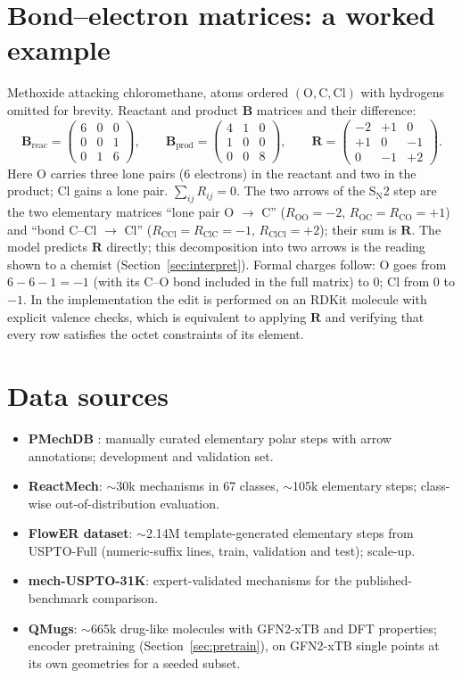 \documentclass[11pt,a4paper]{article}
\newcommand{\vb}[1]{\bm{#1}}
\begin{document}
\section{Bond--electron matrices: a worked example}
\label{app:be}
Methoxide attacking chloromethane, atoms ordered $(\mathrm{O},\mathrm{C},\mathrm{Cl})$ with hydrogens omitted for brevity. Reactant and product $\vb{B}$ matrices and their difference:
\[
\vb{B}_{\mathrm{reac}}=\begin{pmatrix}6&0&0\\0&0&1\\0&1&6\end{pmatrix},\qquad
\vb{B}_{\mathrm{prod}}=\begin{pmatrix}4&1&0\\1&0&0\\0&0&8\end{pmatrix},\qquad
\vb{R}=\begin{pmatrix}-2&+1&0\\+1&0&-1\\0&-1&+2\end{pmatrix}.
\]
Here O carries three lone pairs (6 electrons) in the reactant and two in the product; Cl gains a lone pair. $\sum_{ij}R_{ij}=0$. The two arrows of the S$_\mathrm{N}$2 step are the two elementary matrices ``lone pair O $\to$ C'' ($R_{\mathrm{OO}}=-2$, $R_{\mathrm{OC}}=R_{\mathrm{CO}}=+1$) and ``bond C--Cl $\to$ Cl'' ($R_{\mathrm{CCl}}=R_{\mathrm{ClC}}=-1$, $R_{\mathrm{ClCl}}=+2$); their sum is $\vb{R}$. The model predicts $\vb{R}$ directly; this decomposition into two arrows is the reading shown to a chemist (Section~\ref{sec:interpret}). Formal charges follow: O goes from $6-6-1=-1$ (with its C--O bond included in the full matrix) to $0$; Cl from $0$ to $-1$. In the implementation the edit is performed on an RDKit molecule with explicit valence checks, which is equivalent to applying $\vb{R}$ and verifying that every row satisfies the octet constraints of its element.

\section{Data sources}
\label{app:data}
\begin{itemize}[nosep]
\item \textbf{PMechDB} \cite{pmechdb}: manually curated elementary polar steps with arrow annotations; development and validation set.
\item \textbf{ReactMech}: $\sim$30k mechanisms in 67 classes, $\sim$105k elementary steps; class-wise out-of-distribution evaluation.
\item \textbf{FlowER dataset}: $\sim$2.14M template-generated elementary steps from USPTO-Full (numeric-suffix lines, train, validation and test); scale-up.
\item \textbf{mech-USPTO-31K}: expert-validated mechanisms for the published-benchmark comparison.
\item \textbf{QMugs}: $\sim$665k drug-like molecules with GFN2-xTB and DFT properties; encoder pretraining (Section~\ref{sec:pretrain}), on GFN2-xTB single points at its own geometries for a seeded subset.
\end{itemize}
\end{document}
